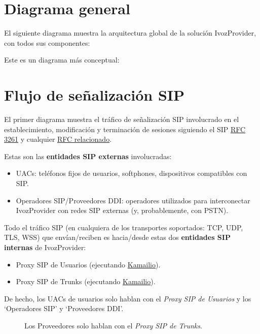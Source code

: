 \documentclass[letterpaper,10pt,spanish]{sphinxmanual}
\begin{document}
\section{Diagrama general}
\label{basic_concepts/architecture/index:general-diagram}
El siguiente diagrama muestra la arquitectura global de la solución IvozProvider, con todos sus componentes:

\noindent{}

Este es un diagrama más conceptual:

\noindent{}


\section{Flujo de señalización SIP}
\label{basic_concepts/architecture/index:sip-signalling-flow}\label{basic_concepts/architecture/index:signallingflow}
El primer diagrama muestra el tráfico de señalización SIP involucrado en el establecimiento, modificación y terminación de sesiones siguiendo el SIP \href{https://tools.ietf.org/html/rfc3261}{RFC 3261} y cualquier \href{https://www.packetizer.com/ipmc/sip/standards.html}{RFC relacionado}.

Estas son las \textbf{entidades SIP externas} involucradas:
\begin{itemize}
\item {} 
UACs: teléfonos fijos de usuarios, softphones, dispositivos compatibles con SIP.

\item {} 
Operadores SIP/Proveedores DDI: operadores utilizados para interconectar IvozProvider con redes SIP externas (y, probablemente, con PSTN).

\end{itemize}

Todo el tráfico SIP (en cualquiera de los transportes soportados: TCP, UDP, TLS, WSS) que envían/reciben es hacia/desde estas dos \textbf{entidades SIP internas} de IvozProvider:
\begin{itemize}
\item {} 
Proxy SIP de Usuarios (ejecutando \href{https://www.kamailio.org}{Kamailio}).

\item {} 
Proxy SIP de Trunks (ejecutando \href{https://www.kamailio.org}{Kamailio}).

\end{itemize}
\begin{description}
\item[{De hecho, los UACs de usuarios solo hablan con el \emph{Proxy SIP de Usuarios} y los `Operadores SIP' y `Proveedores DDI'.}] \leavevmode
Los Proveedores solo hablan con el \emph{Proxy SIP de Trunks}.

\end{description}
\end{document}
